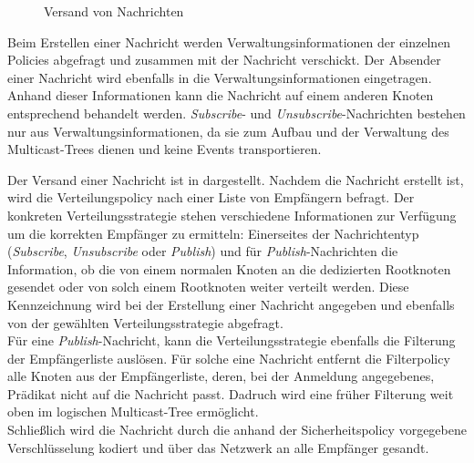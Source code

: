 \begin{figure}[htbp]
\centering
{}
\caption{Versand von Nachrichten}
\label{fig:processing_send}
\end{figure}

Beim Erstellen einer Nachricht werden Verwaltungsinformationen der einzelnen Policies abgefragt und zusammen mit der Nachricht verschickt. Der Absender einer Nachricht wird ebenfalls in die Verwaltungsinformationen eingetragen. Anhand dieser Informationen kann die Nachricht auf einem anderen Knoten entsprechend behandelt werden. \emph{Subscribe}- und \emph{Unsubscribe}-Nachrichten bestehen nur aus Verwaltungsinformationen, da sie zum Aufbau und der Verwaltung des Multicast-Trees dienen und keine Events transportieren.

Der Versand einer Nachricht ist in  dargestellt. Nachdem die Nachricht erstellt ist, wird die Verteilungspolicy nach einer Liste von Empfängern befragt. Der konkreten Verteilungsstrategie stehen verschiedene Informationen zur Verfügung um die korrekten Empfänger zu ermitteln: Einerseites der Nachrichtentyp (\emph{Subscribe}, \emph{Unsubscribe} oder \emph{Publish}) und für \emph{Publish}-Nachrichten die Information, ob die von einem normalen Knoten an die dedizierten Rootknoten gesendet oder von solch einem Rootknoten weiter verteilt werden. Diese Kennzeichnung wird bei der Erstellung einer Nachricht angegeben und ebenfalls von der gewählten Verteilungsstrategie abgefragt.\\
Für eine \emph{Publish}-Nachricht, kann die Verteilungsstrategie ebenfalls die Filterung der Empfängerliste auslösen. Für solche eine Nachricht entfernt die Filterpolicy alle Knoten aus der Empfängerliste, deren, bei der Anmeldung angegebenes, Prädikat nicht auf die Nachricht passt. Dadruch wird eine früher Filterung weit oben im logischen Multicast-Tree ermöglicht.\\
Schließlich wird die Nachricht durch die anhand der Sicherheitspolicy vorgegebene Verschlüsselung kodiert und über das Netzwerk an alle Empfänger gesandt.

